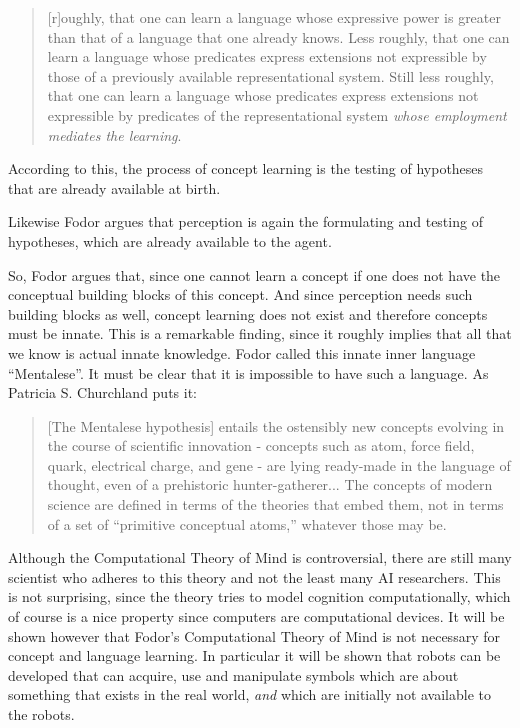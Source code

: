 
\begin{quote}
[r]oughly, that one can learn a language whose expressive power is greater than that of a language that one already knows. Less roughly, that one can learn a language whose predicates express extensions not expressible by those of a previously available representational system. Still less roughly, that one can learn a language whose predicates express extensions not expressible by predicates of the representational system {\em whose employment mediates the learning}. \citep[86, Fodor's italics]{fodor:1975}
\end{quote}


According to this, the process of concept learning is the testing of hypotheses that are already available at birth.

Likewise Fodor argues that perception is again the formulating and testing of hypotheses, which are already available to the agent.


So, Fodor argues that, since one cannot learn a concept if one does not have the conceptual building blocks of this concept. And since perception needs such building blocks as well, concept learning does not exist and therefore concepts must be innate. This is a remarkable finding, since it roughly implies that all that we know is actual innate knowledge. Fodor called this innate inner language ``Mentalese''. It must be clear that it is impossible to have such a language. As Patricia S. Churchland puts it:

\begin{quote}
[The Mentalese hypothesis] entails the ostensibly new concepts evolving in the course of scientific innovation - concepts such as atom, force field, quark, electrical charge, and gene - are lying ready-made in the language of thought, even of a prehistoric hunter-gatherer... The concepts of modern science are defined in terms of the theories that embed them, not in terms of a set of ``primitive conceptual atoms,'' whatever those may be. \citep[389]{p.s.churchland:1986}
\end{quote}


Although the Computational Theory of Mind is controversial, there are still many scientist who adheres to this theory and not the least many AI researchers. This is not surprising, since the theory tries to model cognition computationally, which of course is a nice property since computers are computational devices. It will be shown however that Fodor's Computational Theory of Mind is not necessary for concept and language learning. In particular it will be shown that robots can be developed that can acquire, use and manipulate symbols which are about something that exists in the real world, {\em and} which are initially not available to the robots.
	

